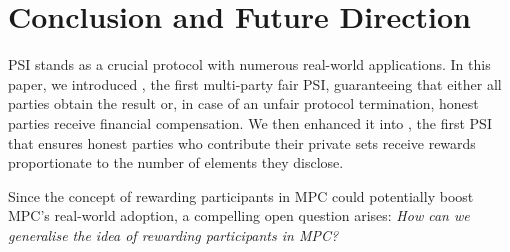 
\vspace{-4mm}
\section{Conclusion and Future Direction}\label{sec::concl}
\vspace{-2mm}


PSI stands as a crucial protocol with numerous real-world applications. In this paper, we introduced \withFai, the first multi-party fair PSI, guaranteeing that either all parties obtain the result or, in case of an unfair protocol termination, honest parties receive financial compensation. We then enhanced it into \withRew, the first PSI that ensures honest parties who contribute their private sets receive rewards proportionate to the number of elements they disclose. 

Since the concept of rewarding participants in MPC could potentially boost MPC's real-world adoption, a compelling open question arises: \textit{How can we generalise the idea of rewarding participants in MPC?}


